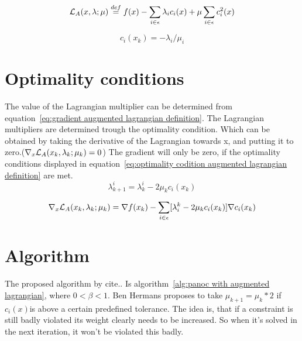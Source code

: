 	\begin{equation}
		\mathcal{L}_A(x,\lambda;\mu) \overset{def}{=} f(x) - \sum_{i \in \epsilon}\lambda_ic_i(x) + \mu \sum_{i \in \epsilon}c_i^2(x)
		\label{eq:augmented lagrangian definition}
	\end{equation}
			
	\begin{equation}
		c_i(x_k) = -\lambda_i/\mu_i
		\label{eq:perturbed feasibility conditions}
	\end{equation}
	

\section{Optimality conditions}
	The value of the Lagrangian multiplier can be determined from equation~\ref{eq:gradient augmented lagrangian definition}. The Lagrangian multipliers are determined trough the optimality condition. Which can be obtained by taking the derivative of the Lagrangian towards x, and putting it to zero.($\nabla_x \mathcal{L}_A(x_k,\lambda_k;\mu_k) = 0$) The gradient will only be zero, if the optimality conditions displayed in equation~\ref{eq:optimality codition augmented lagrangian definition} are met.
	\begin{equation}
		\lambda_{k+1}^{i} = \lambda_{k}^{i} - 2\mu_k c_i(x_k)
		\label{eq:optimality codition augmented lagrangian definition}
	\end{equation}

	\begin{equation}
		\nabla_x \mathcal{L}_A(x_k,\lambda_k;\mu_k) = \nabla f(x_k) - \sum_{i \in \epsilon} [\lambda_i^k - 2\mu_k c_i(x_k)] \nabla c_i(x_k)
		\label{eq:gradient augmented lagrangian definition}
	\end{equation}	
	
	
	
\section{Algorithm}
	The proposed algorithm by cite.. Is algorithm~\ref{alg:panoc with augmented lagrangian}, where $0<\beta<1$. Ben Hermans proposes to take $\mu_{k+1}=\mu_k*2$ if $c_i(x)$is above a certain predefined tolerance. The idea is, that if a constraint is still badly violated its weight clearly needs to be increased. So when it's solved in the next iteration, it won't be violated this badly.
	
